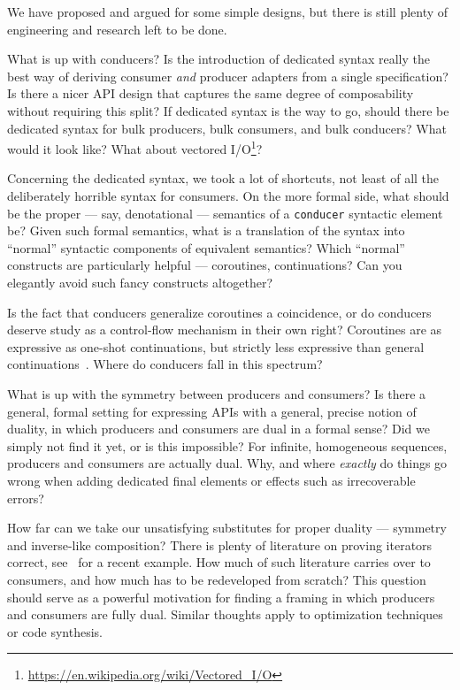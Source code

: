 \documentclass[sigplan,screen,10pt,review]{acmart}
\begin{document}
We have proposed and argued for some simple designs, but there is still plenty of engineering and research left to be done.

What is up with conducers? Is the introduction of dedicated syntax really the best way of deriving consumer \textit{and} producer adapters from a single specification? Is there a nicer API design that captures the same degree of composability without requiring this split? If dedicated syntax is the way to go, should there be dedicated syntax for bulk producers, bulk consumers, and bulk conducers? What would it look like? What about vectored I/O\footnote{\url{https://en.wikipedia.org/wiki/Vectored_I/O}}?

Concerning the dedicated syntax, we took a lot of shortcuts, not least of all the deliberately horrible syntax for consumers. On the more formal side, what should be the proper --- say, denotational --- semantics of a \texttt{conducer} syntactic element be? Given such formal semantics, what is a translation of the syntax into ``normal'' syntactic components of equivalent semantics? Which ``normal'' constructs are particularly helpful --- coroutines, continuations? Can you elegantly avoid such fancy constructs altogether?

Is the fact that conducers generalize coroutines a coincidence, or do conducers deserve study as a control-flow mechanism in their own right? Coroutines are as expressive as one-shot continuations, but strictly less expressive than general continuations~\cite{moura2009revisiting}. Where do conducers fall in this spectrum?

What is up with the symmetry between producers and consumers? Is there a general, formal setting for expressing APIs with a general, precise notion of duality, in which producers and consumers are dual in a formal sense? Did we simply not find it yet, or is this impossible? For infinite, homogeneous sequences, producers and consumers are actually dual. Why, and where \textit{exactly} do things go wrong when adding dedicated final elements or effects such as irrecoverable errors?

How far can we take our unsatisfying substitutes for proper duality --- symmetry and inverse-like composition? There is plenty of literature on proving iterators correct, see~\cite{bily2022compositional} for a recent example. How much of such literature carries over to consumers, and how much has to be redeveloped from scratch? This question should serve as a powerful motivation for finding a framing in which producers and consumers are fully dual. Similar thoughts apply to optimization techniques~\cite{kiselyov2017stream} or code synthesis\cite{rayside2012synthesizing}.
\end{document}
